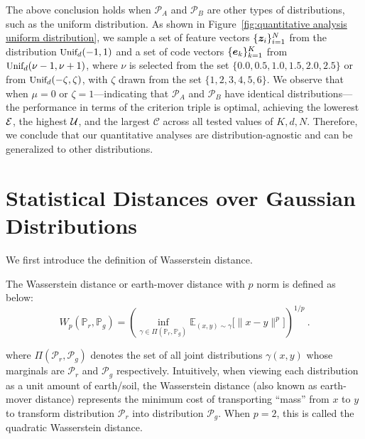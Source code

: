 The above conclusion holds when $\mathcal{P}_A$ and $\mathcal{P}_B$ are other types of distributions, such as the uniform distribution. As shown in Figure~\ref{fig:quantitative analysis uniform distribution}, we sample a set of feature vectors $\{\bm{z}_i\}_{i=1}^N$ from the distribution ${\textnormal{\small Unif}}_d(-1, 1)$ and a set of code vectors $\{\bm{e}_k\}_{k=1}^K$ from ${\textnormal{\small Unif}}_d(\nu-1, \nu+1)$, where $\nu$ is selected from the set  $\{ {0.0}, {0.5}, {1.0}, {1.5}, {2.0}, {2.5}\}$ or from ${\textnormal{\small Unif}}_d(-\zeta, \zeta)$, with $\zeta$ drawn from the set $\{ 1, 2, 3, 4, 5, 6\}$. We observe that when $\mu = 0$ or $\zeta = 1$—indicating that $\mathcal{P}_A$  and $\mathcal{P}_B$ have identical distributions—the performance in terms of the criterion triple is optimal, achieving the lowerest $\mathcal{E}$, the highest $\mathcal{U}$, and the largest $\mathcal{C}$ across all tested values of $K, d, N$. Therefore, we conclude that our quantitative analyses are distribution-agnostic and can be generalized to other distributions.

\section{Statistical Distances over Gaussian Distributions}
\label{appendix: distribution distance}
We first introduce the definition of Wasserstein distance. 
\begin{definition}
\label{def:wasserstien distance}
The Wasserstein distance or earth-mover distance with $p$ norm is defined as below:
\begin{equation}
W_{p}(\mathbb{P}_r, \mathbb{P}_g) = (\inf_{\gamma \in \Pi(\mathbb{P}_r ,\mathbb{P}_g)} \mathbb{E}_{(x, y) \sim \gamma}\big[\|x - y\|^{p}\big])^{1/p}~.
\label{eq:def wasserstein distance}
\end{equation}
\end{definition} where $\Pi(\mathcal{P}_r,\mathcal{P}_g)$ denotes the set of all joint distributions $\gamma(x,y)$ whose marginals are $\mathcal{P}_r$ and $\mathcal{P}_g$ respectively. Intuitively, when viewing each distribution as a unit amount of earth/soil, the Wasserstein distance (also known as earth-mover distance) represents the minimum cost of transporting ``mass'' from $x$ to $y$ to transform distribution $\mathcal{P}_r$ into distribution $\mathcal{P}_g$. When $p=2$, this is called the quadratic Wasserstein distance.

